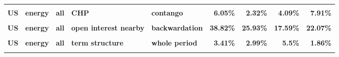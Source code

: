 \documentclass[
  authoryear,
  preprint,
  3p]{elsarticle}
\begin{document}
\begin{landscape}
\begin{longtable}[t]{>{}l>{}l>{}l>{}l>{}l>{}r>{}r>{}r>{}r}
\textbf{\cellcolor{gray!10}{US}} & \textbf{\cellcolor{gray!10}{energy}} & \textbf{\cellcolor{gray!10}{all}} & \textbf{\cellcolor{gray!10}{CHP}} & \textbf{\cellcolor{gray!10}{backwardation}} & \textcolor[HTML]{4285f4}{\textbf{\cellcolor{gray!10}{12.81\%}}} & \textcolor[HTML]{4285f4}{\textbf{\cellcolor{gray!10}{1.01\%}}} & \textcolor[HTML]{4285f4}{\textbf{\cellcolor{gray!10}{2.97\%}}} & \textcolor[HTML]{4285f4}{\textbf{\cellcolor{gray!10}{5.68\%}}}\\
\textbf{US} & \textbf{energy} & \textbf{all} & \textbf{CHP} & \textbf{contango} & \textcolor[HTML]{4285f4}{\textbf{6.05\%}} & \textcolor[HTML]{4285f4}{\textbf{2.32\%}} & \textcolor[HTML]{4285f4}{\textbf{4.09\%}} & \textcolor[HTML]{4285f4}{\textbf{7.91\%}}\\
\textbf{\cellcolor{gray!10}{US}} & \textbf{\cellcolor{gray!10}{energy}} & \textbf{\cellcolor{gray!10}{all}} & \textbf{\cellcolor{gray!10}{open interest nearby}} & \textbf{\cellcolor{gray!10}{whole period}} & \textcolor[HTML]{4285f4}{\textbf{\cellcolor{gray!10}{40\%}}} & \textcolor[HTML]{4285f4}{\textbf{\cellcolor{gray!10}{33.46\%}}} & \textcolor[HTML]{4285f4}{\textbf{\cellcolor{gray!10}{21.16\%}}} & \textcolor[HTML]{4285f4}{\textbf{\cellcolor{gray!10}{27.67\%}}}\\
\textbf{US} & \textbf{energy} & \textbf{all} & \textbf{open interest nearby} & \textbf{backwardation} & \textcolor[HTML]{4285f4}{\textbf{38.82\%}} & \textcolor[HTML]{4285f4}{\textbf{25.93\%}} & \textcolor[HTML]{4285f4}{\textbf{17.59\%}} & \textcolor[HTML]{4285f4}{\textbf{22.07\%}}\\
\addlinespace
\textbf{\cellcolor{gray!10}{US}} & \textbf{\cellcolor{gray!10}{energy}} & \textbf{\cellcolor{gray!10}{all}} & \textbf{\cellcolor{gray!10}{open interest nearby}} & \textbf{\cellcolor{gray!10}{contango}} & \textcolor[HTML]{4285f4}{\textbf{\cellcolor{gray!10}{41.02\%}}} & \textcolor[HTML]{4285f4}{\textbf{\cellcolor{gray!10}{40.42\%}}} & \textcolor[HTML]{4285f4}{\textbf{\cellcolor{gray!10}{23.88\%}}} & \textcolor[HTML]{4285f4}{\textbf{\cellcolor{gray!10}{32.13\%}}}\\
\textbf{US} & \textbf{energy} & \textbf{all} & \textbf{term structure} & \textbf{whole period} & \textcolor[HTML]{4285f4}{\textbf{3.41\%}} & \textcolor[HTML]{4285f4}{\textbf{2.99\%}} & \textcolor[HTML]{4285f4}{\textbf{5.5\%}} & \textcolor[HTML]{4285f4}{\textbf{1.86\%}}\\
\textbf{\cellcolor{gray!10}{US}} & \textbf{\cellcolor{gray!10}{energy}} & \textbf{\cellcolor{gray!10}{all}} & \textbf{\cellcolor{gray!10}{term structure}} & \textbf{\cellcolor{gray!10}{backwardation}} & \textcolor[HTML]{4285f4}{\textbf{\cellcolor{gray!10}{7.4\%}}} & \textcolor[HTML]{4285f4}{\textbf{\cellcolor{gray!10}{3.75\%}}} & \textcolor[HTML]{4285f4}{\textbf{\cellcolor{gray!10}{4.93\%}}} & \textcolor[HTML]{4285f4}{\textbf{\cellcolor{gray!10}{3.4\%}}}\\

\end{longtable}
\end{landscape}
\end{document}

